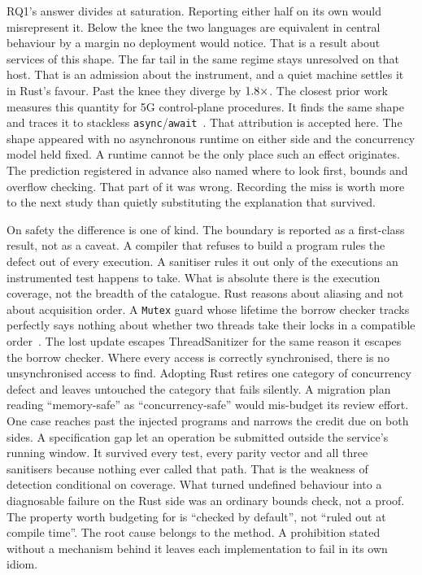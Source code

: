 \documentclass[english,twoside,openright,a4paper,censored,csm,software-track-2020]{HYthesisML}
\begin{document}
RQ1's answer divides at saturation. Reporting either half on its own would
misrepresent it. Below the knee the two languages are equivalent in central behaviour by
a margin no deployment would notice. That is a result about services of this shape. The
far tail in the same regime stays unresolved on that host. That is an admission about the
instrument, and a quiet machine settles it in Rust's favour.
Past the knee they diverge by $1.8\times$. The closest prior work measures
this quantity for 5G control-plane procedures. It finds the same shape and traces it to
stackless \texttt{async}/\texttt{await}~\cite{arvidsson2025async}. That attribution is
accepted here. The shape appeared with no asynchronous runtime on either side and the
concurrency model held fixed. A runtime cannot be the only place such an effect
originates. The prediction registered in advance also named where to look first, bounds
and overflow checking. That part of it was wrong. Recording the miss is worth more to
the next study than quietly substituting the explanation that survived.

On safety the difference is one of kind. The boundary is reported as a first-class
result, not as a caveat. A compiler that refuses to build a program rules the defect out
of every execution. A sanitiser rules it out only of the executions an instrumented test
happens to take. What is absolute there is the execution coverage, not the breadth of
the catalogue. Rust reasons about aliasing and not about acquisition order. A
\texttt{Mutex} guard whose lifetime the borrow checker tracks perfectly says nothing
about whether two threads take their locks in a compatible
order~\cite{zhang2026deadlock}. The lost update escapes ThreadSanitizer for the same
reason it escapes the borrow checker. Where every access is correctly synchronised, there
is no unsynchronised access to find. Adopting Rust retires one category of concurrency
defect and leaves untouched the category that fails silently. A migration plan reading
``memory-safe'' as ``concurrency-safe'' would mis-budget its review effort. One case
reaches past the injected programs and narrows the credit due on both sides. A
specification gap let an operation be submitted outside the service's running window. It
survived every test, every parity vector and all three sanitisers because nothing ever
called that path. That is the weakness of detection conditional on coverage. What turned
undefined behaviour into a diagnosable failure on the Rust side was an ordinary bounds
check, not a proof. The property worth budgeting for is ``checked by default'', not
``ruled out at compile time''. The root cause belongs to the method. A prohibition stated
without a mechanism behind it leaves each implementation to fail in its own idiom.
\end{document}
